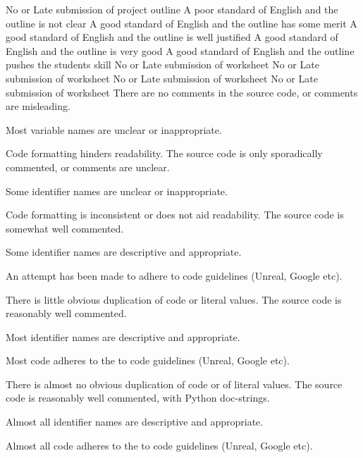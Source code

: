\documentclass{../../fal_assignment}
\begin{document}
\rubricyeartwo
\begin{markingrubric}
		\grade\fail No or Late submission of project outline
	\grade A poor standard of English and the outline is not clear
	\grade A good standard of English and the outline has some merit
	\grade A good standard of English and the outline is well justified
	\grade A good standard of English and the outline is very good
	\grade A good standard of English and the outline pushes the students skill
		\grade\fail No or Late submission of worksheet
		\grade\fail No or Late submission of worksheet
		\grade\fail No or Late submission of worksheet
		\grade\fail No or Late submission of worksheet
\grade\fail There are no comments in the source code, or comments are misleading.
\par Most variable names are unclear or inappropriate.
\par Code formatting hinders readability.
\grade The source code is only sporadically commented, or comments are unclear.
\par Some identifier names are unclear or inappropriate.
\par Code formatting is inconsistent or does not aid readability.
\grade The source code is somewhat well commented.
\par Some identifier names are descriptive and appropriate.
\par An attempt has been made to adhere to code guidelines (Unreal, Google etc).
\par There is little obvious duplication of code or literal values.           
\grade The source code is reasonably well commented.
\par Most identifier names are descriptive and appropriate.
\par Most code adheres to the to code guidelines (Unreal, Google etc).
\par There is almost no obvious duplication of code or of literal values.   
\grade The source code is reasonably well commented, with Python doc-strings.
\par Almost all identifier names are descriptive and appropriate.
\par Almost all code adheres to the to code guidelines (Unreal, Google etc).

\end{markingrubric}
\end{document}
